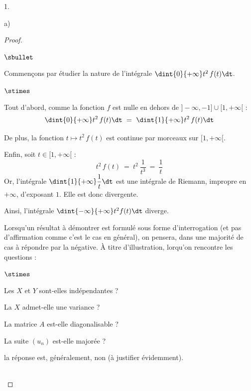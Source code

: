 \documentclass[11pt]{article}%
\begin{document}
\begin{noliste}{1.}
\begin{noliste}{a)}
\begin{proof}
\begin{noliste}{$\sbullet$}
        
        
        
      \item Commençons par étudier la nature de l'intégrale
        $\dint{0}{+\infty} t^2 \, f(t) \dt$.
        \begin{noliste}{$\stimes$}
        \item Tout d'abord, comme la fonction $f$ est nulle en
          dehors de $]-\infty, -1] \cup [1,+\infty[$ :
          \[
          \dint{0}{+\infty} t^2 \, f(t) \dt \ = \ \dint{1}{+\infty}
          t^2 \, f(t) \dt
          \]
          
        \item De plus, la fonction $t \mapsto t^2 \, f(t)$ est
          continue par morceaux sur $[1,+\infty[$.
          
        \item Enfin, soit $t \in [1,+\infty[$ :
          \[
          t^2 \, f(t) \ = \ t^2 \ \dfrac{1}{t^3} \ = \ \dfrac{1}{t}
          \]
          Or, l'intégrale $\dint{1}{+\infty} \dfrac{1}{t} \dt$ est
          une intégrale de Riemann, impropre en $+\infty$,
          d'exposant $1$. Elle est donc divergente.
        \end{noliste}
        
      \item Ainsi, l'intégrale $\dint{-\infty}{+\infty} t^2 f(t)
        \dt$ diverge.%
      \end{noliste}
      \begin{remark}
        Lorsqu'un résultat à démontrer est formulé sous forme
        d'interrogation (et pas d'affirmation comme c'est le cas en
        général), on pensera, dans une majorité de cas à répondre
        par la négative. À titre d'illustration, lorqu'on rencontre
        les questions :
        \begin{noliste}{$\stimes$}
        \item \og Les \var $X$ et $Y$ sont-elles indépendantes ?
          \fg{}
          
        \item \og La \var $X$ admet-elle une variance ? \fg{}
          
        \item \og La matrice $A$ est-elle diagonalisable ? \fg{}
          
        \item \og La suite $(u_n)$ est-elle majorée ? \fg{}
        \end{noliste}
        la réponse est, généralement, \og non \fg{} (à justifier
        évidemment).
      \end{remark}~\\[-1.4cm]
    \end{proof}
  \end{noliste}
  

\end{noliste}
\end{document}
